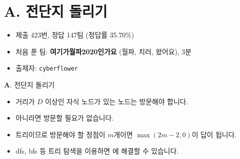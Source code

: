 \section{A. 전단지 돌리기}

\begin{frame} %
    \begin{itemize}
        \item 제출 423번, 정답 147팀 (정답률 35.70\%)
        \item 처음 푼 팀: \textbf{여기가월파2020인가요} (월파, 치러, 왔어요), 3분
        \item 출제자: \texttt{cyberflower}
    \end{itemize}
\end{frame}

\begin{frame}{\textbf{A}. 전단지 돌리기}
    \begin{itemize}
        \item 거리가 $D$ 이상인 자식 노드가 있는 노드는 방문해야 합니다.
        \item 아니라면 방문할 필요가 없습니다.
        \item 트리이므로 방문해야 할 정점이 $m$개이면 $\max(2m-2, 0)$이 답이 됩니다.
        \item dfs, bfs 등 트리 탐색을 이용하면  에 해결할 수 있습니다. 

    \end{itemize}
\end{frame}